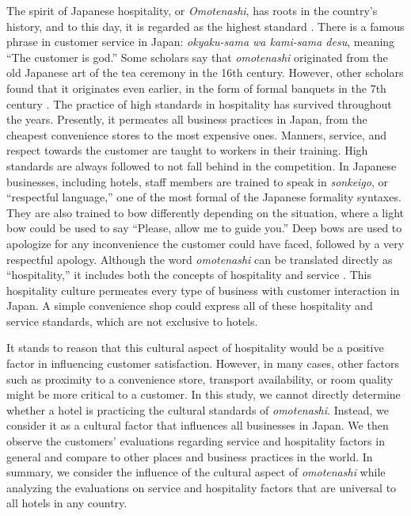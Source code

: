 \documentclass[smallextended,natbib]{svjour3}       %
\begin{document}
    The spirit of Japanese hospitality, or \textit{Omotenashi}, has roots in the country’s history, and to this day, it is regarded as the highest standard \cite[][]{ikeda2013omotenashi, al2015characteristics}. There is a famous phrase in customer service in Japan: \textit{okyaku-sama wa kami-sama desu}, meaning ``The customer is god.'' Some scholars say that \textit{omotenashi} originated from the old Japanese art of the tea ceremony in the 16th century. However, other scholars found that it originates even earlier, in the form of formal banquets in the 7th century \cite[][]{aishima2015origin}. The practice of high standards in hospitality has survived throughout the years. Presently, it permeates all business practices in Japan, from the cheapest convenience stores to the most expensive ones. Manners, service, and respect towards the customer are taught to workers in their training. High standards are always followed to not fall behind in the competition. In Japanese businesses, including hotels, staff members are trained to speak in \textit{sonkeigo}, or ``respectful language,'' one of the most formal of the Japanese formality syntaxes. They are also trained to bow differently depending on the situation, where a light bow could be used to say ``Please, allow me to guide you.'' Deep bows are used to apologize for any inconvenience the customer could have faced, followed by a very respectful apology. Although the word \textit{omotenashi} can be translated directly as ``hospitality,'' it includes both the concepts of hospitality and service \cite[][]{Kuboyama2020}. This hospitality culture permeates every type of business with customer interaction in Japan. A simple convenience shop could express all of these hospitality and service standards, which are not exclusive to hotels.  

    It stands to reason that this cultural aspect of hospitality would be a positive factor in influencing customer satisfaction. However, in many cases, other factors such as proximity to a convenience store, transport availability, or room quality might be more critical to a customer.  In this study, we cannot directly determine whether a hotel is practicing the cultural standards of \textit{omotenashi}. Instead, we consider it as a cultural factor that influences all businesses in Japan. We then observe the customers' evaluations regarding service and hospitality factors in general and compare to other places and business practices in the world. In summary, we consider the influence of the cultural aspect of \textit{omotenashi} while analyzing the evaluations on service and hospitality factors that are universal to all hotels in any country.
\end{document}
